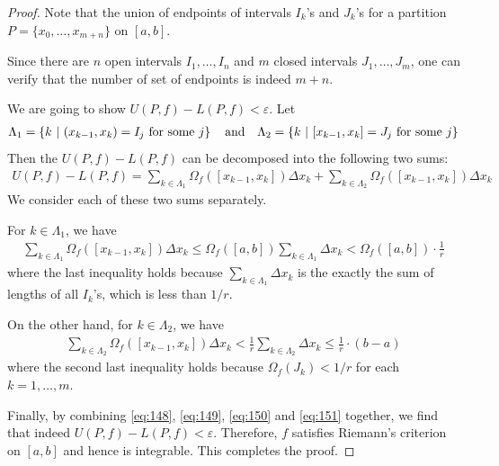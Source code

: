 \documentclass[thmcnt=section, 12pt]{my-elegantbook}
\begin{document}
\begin{proof}
    Note that the union of endpoints of intervals $I_k$'s and $J_k$'s
    for a partition $P=\{x_0, \ldots, x_{m+n}\}$ on $[a, b]$.
    \begin{note}
        Since there are $n$ open intervals $I_1, \ldots, I_n$
        and $m$ closed intervals $J_1, \ldots, J_m$,
        one can verify that the number of set of endpoints
        is indeed $m+n$.
    \end{note}
    \noindent We are going to show $U(P,f) - L(P,f) < \varepsilon$.
    Let
    \begin{align*}
        \Lambda_1 = \left\{ k \ \middle| \ (x_{k-1}, x_k) = I_j \text{ for some $j$} \right\}
        \quad \text{and} \quad
        \Lambda_2 = \left\{ k \ \middle| \ [x_{k-1}, x_k] = J_j \text{ for some $j$} \right\}
    \end{align*}
    Then the $U(P,f) - L(P,f)$ can be decomposed into
    the following two sums:
    \begin{align}
        U(P,f) - L(P,f)
        = \sum_{k \in \Lambda_1} \Omega_f([x_{k-1}, x_k]) \Delta x_k
        + \sum_{k \in \Lambda_2} \Omega_f([x_{k-1}, x_k]) \Delta x_k
        \label{eq:149}
    \end{align}
    We consider each of these two sums separately.

    For $k \in \Lambda_1$, we have
    \begin{align}
        \sum_{k \in \Lambda_1} \Omega_f([x_{k-1}, x_k]) \Delta x_k
        \leq \Omega_f([a, b]) \sum_{k \in \Lambda_1} \Delta x_k
        < \Omega_f([a, b]) \cdot \frac{1}{r}
        \label{eq:150}
    \end{align}
    where the last inequality holds
    because $\sum_{k \in \Lambda_1} \Delta x_k$ is the exactly
    the sum of lengths of all $I_k$'s, which is less than $1 / r$.

    On the other hand, for $k \in \Lambda_2$,
    we have
    \begin{align}
        \sum_{k \in \Lambda_2} \Omega_f([x_{k-1}, x_k]) \Delta x_k
        < \frac{1}{r} \sum_{k \in \Lambda_2} \Delta x_k
        \leq \frac{1}{r} \cdot (b - a)
        \label{eq:151}
    \end{align}
    where the second last inequality holds
    because $\Omega_f(J_k) < 1 / r$ for each $k=1, \ldots, m$.

    Finally, by combining \eqref{eq:148}, \eqref{eq:149}, \eqref{eq:150}
    and \eqref{eq:151} together,
    we find that indeed $U(P,f) - L(P,f) < \varepsilon$.
    Therefore, $f$ satisfies Riemann's criterion on $[a, b]$
    and hence is integrable.
    This completes the proof.
\end{proof}
\end{document}
